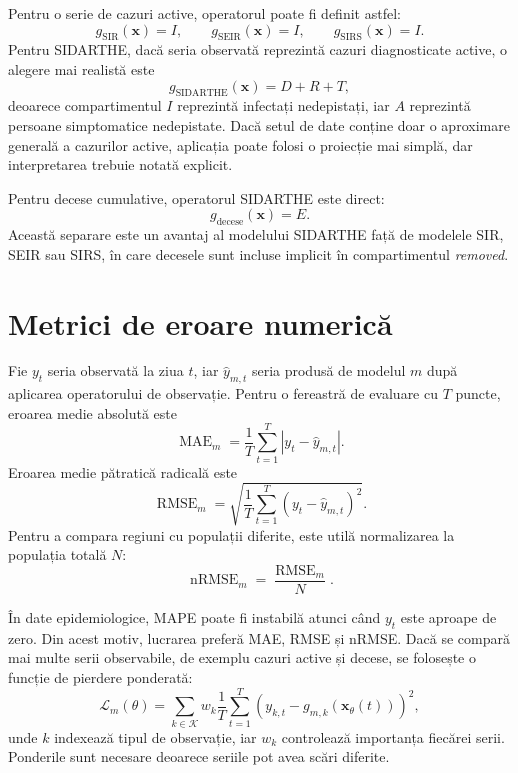 Pentru o serie de cazuri active, operatorul poate fi definit astfel:
\begin{equation}
g_{\text{SIR}}(\mathbf{x}) = I, \qquad
g_{\text{SEIR}}(\mathbf{x}) = I, \qquad
g_{\text{SIRS}}(\mathbf{x}) = I.
\end{equation}
Pentru SIDARTHE, dacă seria observată reprezintă cazuri diagnosticate active, o
alegere mai realistă este
\begin{equation}
g_{\text{SIDARTHE}}(\mathbf{x}) = D + R + T,
\end{equation}
deoarece compartimentul $I$ reprezintă infectați nedepistați, iar $A$ reprezintă
persoane simptomatice nedepistate. Dacă setul de date conține doar o aproximare
generală a cazurilor active, aplicația poate folosi o proiecție mai simplă, dar
interpretarea trebuie notată explicit.

Pentru decese cumulative, operatorul SIDARTHE este direct:
\begin{equation}
g_{\text{decese}}(\mathbf{x}) = E.
\end{equation}
Această separare este un avantaj al modelului SIDARTHE față de modelele SIR,
SEIR sau SIRS, în care decesele sunt incluse implicit în compartimentul
\emph{removed}.

\section{Metrici de eroare numerică}
\label{sec:metrici_eroare_numerica}

Fie $y_t$ seria observată la ziua $t$, iar $\hat{y}_{m,t}$ seria produsă de
modelul $m$ după aplicarea operatorului de observație. Pentru o fereastră de
evaluare cu $T$ puncte, eroarea medie absolută este
\begin{equation}
\operatorname{MAE}_m =
\frac{1}{T}\sum_{t=1}^{T}\left|y_t-\hat{y}_{m,t}\right|.
\end{equation}
Eroarea medie pătratică radicală este
\begin{equation}
\operatorname{RMSE}_m =
\sqrt{\frac{1}{T}\sum_{t=1}^{T}\left(y_t-\hat{y}_{m,t}\right)^2}.
\end{equation}
Pentru a compara regiuni cu populații diferite, este utilă normalizarea la
populația totală $N$:
\begin{equation}
\operatorname{nRMSE}_m = \frac{\operatorname{RMSE}_m}{N}.
\end{equation}

În date epidemiologice, MAPE poate fi instabilă atunci când $y_t$ este aproape
de zero. Din acest motiv, lucrarea preferă MAE, RMSE și nRMSE. Dacă se compară
mai multe serii observabile, de exemplu cazuri active și decese, se folosește o
funcție de pierdere ponderată:
\begin{equation}
\mathcal{L}_m(\theta) =
\sum_{k \in \mathcal{K}} w_k
\frac{1}{T}\sum_{t=1}^{T}
\left(y_{k,t}-g_{m,k}(\mathbf{x}_{\theta}(t))\right)^2,
\end{equation}
unde $k$ indexează tipul de observație, iar $w_k$ controlează importanța fiecărei
serii. Ponderile sunt necesare deoarece seriile pot avea scări diferite.

